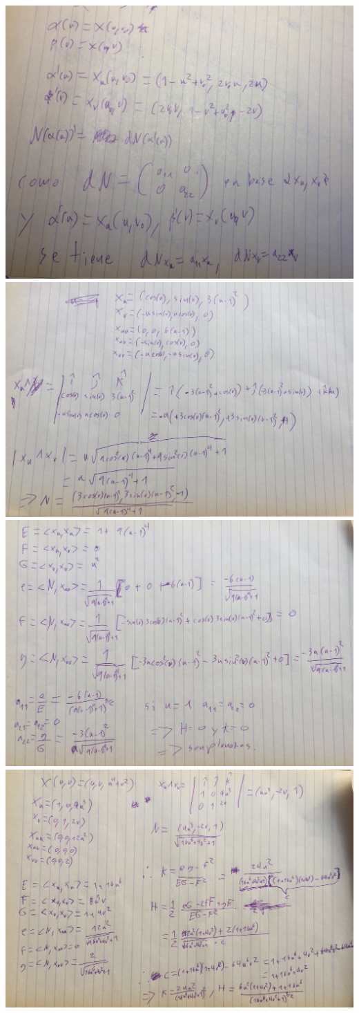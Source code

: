 \includegraphics{img/IMG_5933.jpg}
\includegraphics{img/IMG_5934.jpg}
\includegraphics{img/IMG_5935.jpg}
\includegraphics{img/IMG_5936.jpg}
